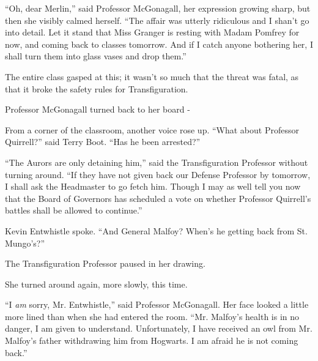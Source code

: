 ``Oh, dear Merlin,'' said Professor McGonagall, her expression growing sharp, but then she visibly calmed herself. ``The affair was utterly ridiculous and I shan't go into detail. Let it stand that Miss Granger is resting with Madam Pomfrey for now, and coming back to classes tomorrow. And if I catch anyone bothering her, I shall turn them into glass vases and drop them.''

The entire class gasped at this; it wasn't so much that the threat was fatal, as that it broke the safety rules for Transfiguration.

Professor McGonagall turned back to her board -

From a corner of the classroom, another voice rose up. ``What about Professor Quirrell?'' said Terry Boot. ``Has he been arrested?''

``The Aurors are only detaining him,'' said the Transfiguration Professor without turning around. ``If they have not given back our Defense Professor by tomorrow, I shall ask the Headmaster to go fetch him. Though I may as well tell you now that the Board of Governors has scheduled a vote on whether Professor Quirrell's battles shall be allowed to continue.''

Kevin Entwhistle spoke. ``And General Malfoy? When's he getting back from St. Mungo's?''

The Transfiguration Professor paused in her drawing.

She turned around again, more slowly, this time.

``I \emph{am} sorry, Mr. Entwhistle,'' said Professor McGonagall. Her face looked a little more lined than when she had entered the room. ``Mr. Malfoy's health is in no danger, I am given to understand. Unfortunately, I have received an owl from Mr. Malfoy's father withdrawing him from Hogwarts. I am afraid he is not coming back.''
